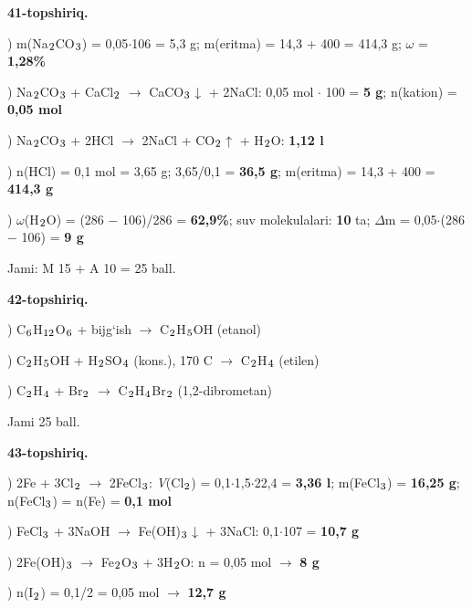 \documentclass[11pt,a4paper]{article}
\renewcommand{\textsubscript}[1]{\ensuremath{_{\text{\fontsize{8}{8}\selectfont #1}}}}
\begin{document}
\noindent\textbf{41-topshiriq.}\par
{}) m(Na\textsubscript{2}CO\textsubscript{3}) = 0,05$\cdot$106 = 5,3 g; m(eritma) = 14,3 + 400 = 414,3 g; $\omega$ = \textbf{1,28\%}\par
{}) Na\textsubscript{2}CO\textsubscript{3} + CaCl\textsubscript{2} $\to$ CaCO\textsubscript{3}$\downarrow$ + 2NaCl: 0,05 mol $\cdot$ 100 = \textbf{5 g}; n(kation) = \textbf{0,05 mol}\par
{}) Na\textsubscript{2}CO\textsubscript{3} + 2HCl $\to$ 2NaCl + CO\textsubscript{2}$\uparrow$ + H\textsubscript{2}O: \textbf{1,12 l}\par
{}) n(HCl) = 0,1 mol = 3,65 g; 3,65/0,1 = \textbf{36,5 g}; m(eritma) = 14,3 + 400 = \textbf{414,3 g}\par
{}) $\omega$(H\textsubscript{2}O) = (286 $-$ 106)/286 = \textbf{62,9\%}; suv molekulalari: \textbf{10} ta; $\Delta$m = 0,05$\cdot$(286 $-$ 106) = \textbf{9 g}\par
\noindent Jami: M 15 + A 10 = 25 ball.\par
\noindent\textbf{42-topshiriq.}\par
{}) C\textsubscript{6}H\textsubscript{12}O\textsubscript{6} + bijg`ish $\to$ C\textsubscript{2}H\textsubscript{5}OH (etanol)\par
{}) C\textsubscript{2}H\textsubscript{5}OH + H\textsubscript{2}SO\textsubscript{4} (kons.), 170 \textdegree{}C $\to$ C\textsubscript{2}H\textsubscript{4} (etilen)\par
{}) C\textsubscript{2}H\textsubscript{4} + Br\textsubscript{2} $\to$ C\textsubscript{2}H\textsubscript{4}Br\textsubscript{2} (1,2-dibrometan)\par
\noindent Jami 25 ball.\par
\noindent\textbf{43-topshiriq.}\par
{}) 2Fe + 3Cl\textsubscript{2} $\to$ 2FeCl\textsubscript{3}: \textit{V}(Cl\textsubscript{2}) = 0,1$\cdot$1,5$\cdot$22,4 = \textbf{3,36 l}; m(FeCl\textsubscript{3}) = \textbf{16,25 g}; n(FeCl\textsubscript{3}) = n(Fe) = \textbf{0,1 mol}\par
{}) FeCl\textsubscript{3} + 3NaOH $\to$ Fe(OH)\textsubscript{3}$\downarrow$ + 3NaCl: 0,1$\cdot$107 = \textbf{10,7 g}\par
{}) 2Fe(OH)\textsubscript{3} $\to$ Fe\textsubscript{2}O\textsubscript{3} + 3H\textsubscript{2}O: n = 0,05 mol $\to$ \textbf{8 g}\par
{}) n(I\textsubscript{2}) = 0,1/2 = 0,05 mol $\to$ \textbf{12,7 g}\par
\end{document}
